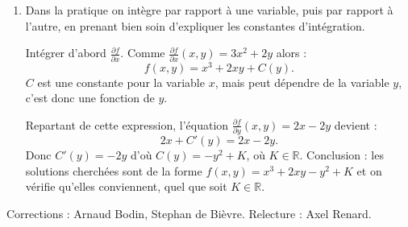 \documentclass[11pt,a4paper]{article}
\newcommand{\Rr}{\mathbb{R}} \newcommand{\R}{\mathbb{R}}
\theoremstyle{exostyle}
\begin{document}
\begin{enumerate}
	\item Dans la pratique on intègre par rapport à une variable, puis par rapport à l'autre, en prenant bien soin d'expliquer les constantes d'intégration.
	
	Intégrer d'abord $\frac{\partial f}{\partial x}$. 
	Comme $\frac{\partial f}{\partial x}(x,y) = 3x^2 + 2y$ alors :
	\[
	f(x,y) = x^3+2xy + C(y).
	\]
	$C$ est une constante pour la variable $x$, mais peut dépendre de la variable $y$, c'est donc une fonction de $y$.
	
	Repartant de cette expression, l'équation $\frac{\partial f}{\partial y}(x,y) = 2x - 2y$
	devient :
	\[
	2x + C'(y) = 2x-2y. \]
	Donc $C'(y) = -2y$ d'où $C(y) = -y^2+K$, où $K\in \Rr$.
	Conclusion : les solutions cherchées sont de la forme  $f(x,y) = x^3+2xy-y^2+K$ et on vérifie qu'elles conviennent, quel que soit $K\in\Rr$.
\end{enumerate}
\fincorrection
\finexercice

\bigskip

Corrections : Arnaud Bodin, Stephan de Bièvre. Relecture : Axel Renard.
\end{document}
